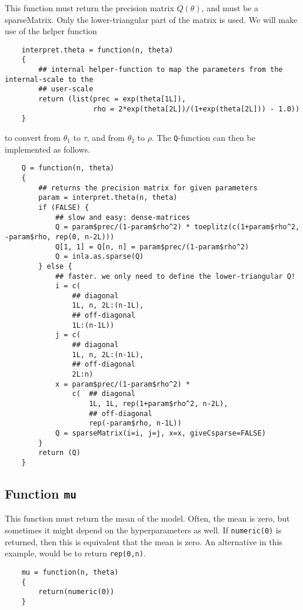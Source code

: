 \documentclass[a4paper,11pt]{article}
\begin{document}
This function must return the precision matrix $Q(\theta)$, and 
must be a sparseMatrix. Only the
lower-triangular part of the matrix is used. We will make use of the
helper function
{\small
\begin{verbatim}
    interpret.theta = function(n, theta)
    {
        ## internal helper-function to map the parameters from the internal-scale to the
        ## user-scale
        return (list(prec = exp(theta[1L]),
                     rho = 2*exp(theta[2L])/(1+exp(theta[2L])) - 1.0))
    }
\end{verbatim}
}
to convert from $\theta_{1}$ to $\tau$, and from $\theta_{2}$ to
$\rho$.  The \texttt{Q}-function can then be implemented as follows.
{\small
\begin{verbatim}
    Q = function(n, theta)
    {
        ## returns the precision matrix for given parameters
        param = interpret.theta(n, theta)
        if (FALSE) {
            ## slow and easy: dense-matrices
            Q = param$prec/(1-param$rho^2) * toeplitz(c(1+param$rho^2, -param$rho, rep(0, n-2L)))
            Q[1, 1] = Q[n, n] = param$prec/(1-param$rho^2)
            Q = inla.as.sparse(Q)
        } else {
            ## faster. we only need to define the lower-triangular Q!
            i = c(
                ## diagonal
                1L, n, 2L:(n-1L),
                ## off-diagonal
                1L:(n-1L))
            j = c(
                ## diagonal
                1L, n, 2L:(n-1L),
                ## off-diagonal
                2L:n)
            x = param$prec/(1-param$rho^2) *
                c(  ## diagonal
                    1L, 1L, rep(1+param$rho^2, n-2L),
                    ## off-diagonal
                    rep(-param$rho, n-1L))
            Q = sparseMatrix(i=i, j=j, x=x, giveCsparse=FALSE)
        }            
        return (Q)
    }
\end{verbatim}
}

\subsection*{Function \texttt{mu}}

This function must return the mean of the model. Often, the mean is
zero, but sometimes it might depend on the hyperparameters as well. If
\texttt{numeric(0)} is returned, then this is equivalent that the mean
is zero. An alternative in this example, would be to return
\texttt{rep(0,n)}.

{\small
\begin{verbatim}
    mu = function(n, theta)
    {
        return(numeric(0))
    }
\end{verbatim}
}
\end{document}

